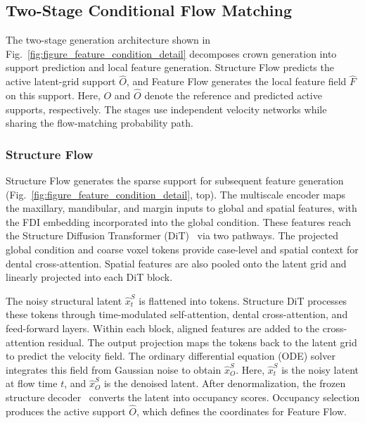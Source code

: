 \documentclass[preprint,review,12pt]{elsarticle}
\begin{document}
\subsection{Two-Stage Conditional Flow Matching}\label{subsec3_4}

\hspace{2em}The two-stage generation architecture shown in Fig.~\ref{fig:figure_feature_condition_detail} decomposes crown generation into support prediction and local feature generation. Structure Flow predicts the active latent-grid support \(\hat O\), and Feature Flow generates the local feature field \(\hat F\) on this support. Here, \(O\) and \(\hat O\) denote the reference and predicted active supports, respectively. The stages use independent velocity networks while sharing the flow-matching probability path.

\subsubsection{Structure Flow}\label{subsec3_4_1}

\hspace{2em}Structure Flow generates the sparse support for subsequent feature generation (Fig.~\ref{fig:figure_feature_condition_detail}, top). The multiscale encoder maps the maxillary, mandibular, and margin inputs to global and spatial features, with the FDI embedding incorporated into the global condition. These features reach the Structure Diffusion Transformer (DiT)~\cite{peebles2023scalable} via two pathways. The projected global condition and coarse voxel tokens provide case-level and spatial context for dental cross-attention. Spatial features are also pooled onto the latent grid and linearly projected into each DiT block.

\hspace{2em}The noisy structural latent \(\hat{x}_t^S\) is flattened into tokens. Structure DiT processes these tokens through time-modulated self-attention, dental cross-attention, and feed-forward layers. Within each block, aligned features are added to the cross-attention residual. The output projection maps the tokens back to the latent grid to predict the velocity field. The ordinary differential equation (ODE) solver integrates this field from Gaussian noise to obtain \(\hat{x}_O^S\). Here, \(\hat{x}_t^S\) is the noisy latent at flow time \(t\), and \(\hat{x}_O^S\) is the denoised latent. After denormalization, the frozen structure decoder~\cite{Xiang2025TRELLIS,xiang2026native} converts the latent into occupancy scores. Occupancy selection produces the active support \(\hat{O}\), which defines the coordinates for Feature Flow.
\end{document}
